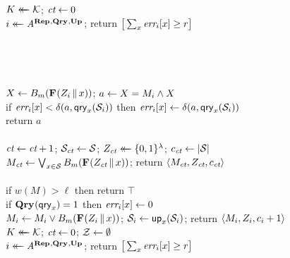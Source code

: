 \begin{figure*}
{
  \vspace{-7pt}
  \\[2pt]
    $\key \getsr \keys$;
    $\ct \gets 0$\\
    $i \getsr \advA^{\REPO,\QRYO,\UPO}$;
    return $\big[\sum_x \err_i[x] \geq r\big]$
  \\[6pt]
  \hfill{}\\[2pt]
    \\
  \\[6pt]
  \\[2pt]
    $X \gets \bmap_m(\PRFO(\salt_i \cat x))$;
    $a \gets X = M_i \AND X$\\
    if $\err_i[x] < \delta(a,\qry_x(\col_i))$ then
          $\err_i[x] \gets \delta(a,\qry_x(\col_i))$\\
    return $a$
  \\[6pt]
  \oraclev{$\REPO(\col)$}\\[2pt]
    $\ct \gets \ct+1$;
    $\setS_{\ct} \gets \col$;
    $\salt_{\ct} \getsr \bits^\lambda$;
    $c_{\ct} \gets |\col|$\\
    $M_{\ct} \gets \bigvee_{x \in \col} \bmap_m(\PRFO(\salt_{\ct} \cat x))$;
    return $\langle M_{\ct}, \salt_{\ct}, c_{\ct} \rangle$
  \\[6pt]
  \\[2pt]
    if $w(M) > \ell$ then return $\top$\\
    if $\QRYO(\qry_x) = 1$ then $\err_i[x] \gets 0$\\
    $M_i \gets M_i \vee \bmap_m(\PRFO(\salt_i \cat x))$;
    $\setS_i \gets \up_x(\setS_i)$;
    return $\langle M_i, \salt_i, c_i+1\rangle$
}
{
  \vspace{-7pt}
  \hfill{}\\[2pt]
    $\key \getsr \keys$;
    $\ct \gets 0$;
    $\setZ \gets \emptyset$\\
    $i \getsr \advA^{\REPO,\QRYO,\UPO}$;
    return $\big[\sum_x \err_i[x] \geq r\big]$
  \\[6pt]
  \oraclev{$\REPO(\col)$}\\[2pt]
}
\end{figure*}
